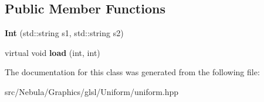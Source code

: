 \subsection*{\-Public \-Member \-Functions}
\begin{DoxyCompactItemize}
\item 
\hypertarget{classNeb_1_1glsl_1_1Uniform_1_1Vector_1_1Int_a48b39d8547200b58574b24e47a921979}{{\bfseries \-Int} (std\-::string s1, std\-::string s2)}\label{classNeb_1_1glsl_1_1Uniform_1_1Vector_1_1Int_a48b39d8547200b58574b24e47a921979}

\item 
\hypertarget{classNeb_1_1glsl_1_1Uniform_1_1Vector_1_1Int_a0675a188d118e248014f268109a8baf5}{virtual void {\bfseries load} (int, int)}\label{classNeb_1_1glsl_1_1Uniform_1_1Vector_1_1Int_a0675a188d118e248014f268109a8baf5}

\end{DoxyCompactItemize}


\-The documentation for this class was generated from the following file\-:\begin{DoxyCompactItemize}
\item 
src/\-Nebula/\-Graphics/glsl/\-Uniform/uniform.\-hpp\end{DoxyCompactItemize}
